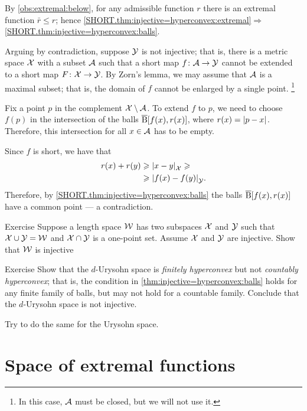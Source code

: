 By \ref{obs:extremal:below}, for any admissible function $r$ there is an extremal function $\bar r\le r$;
hence \ref{SHORT.thm:injective=hyperconvex:extremal}$\Rightarrow$\ref{SHORT.thm:injective=hyperconvex:balls}.

Arguing by contradiction, suppose $\mathcal{Y}$ is not injective;
that is, there is a metric space $\mathcal{X}$ with a subset $\mathcal{A}$
such that a short map $f\colon\mathcal{A}\to \mathcal{Y}$ cannot be extended to a short map $F\colon\mathcal{X}\to \mathcal{Y}$.
By Zorn's lemma, we may assume that $\mathcal{A}$ is a maximal subset; that is, the domain of $f$ cannot be enlarged by a single point.%
\footnote{In this case, $\mathcal{A}$ must be closed, but we will not use it.}

Fix a point $p$ in the complement $\mathcal{X}\setminus \mathcal{A}$.
To extend $f$ to $p$, we need to choose $f(p)$ in the intersection of the balls 
$\overline{\mathrm{B}}{}[f(x),r(x)]$, where $r(x)=\dist{p}{x}{}$.
Therefore, this intersection for all $x\in \mathcal{A}$ has to be empty.

Since $f$ is short, we have that 
\begin{align*}
r(x)+r(y)&\ge \dist{x}{y}{\spc{X}}\ge
\\
&\ge \dist{f(x)}{f(y)}{\spc{Y}}.
\end{align*}
Therefore, by \ref{SHORT.thm:injective=hyperconvex:balls} the balls 
$\overline{\mathrm{B}}{}[f(x),r(x)]$ have a common point --- a contradiction. 
\qeds

\begin{thm}{Exercise}\label{ex:one-point-gluing}
Suppose a length space $\mathcal{W}$ has two subspaces $\mathcal{X}$ and $\mathcal{Y}$ such that $\mathcal{X}\cup\mathcal{Y}=\mathcal{W}$ and $\mathcal{X}\cap\mathcal{Y}$ is a one-point set.
Assume $\mathcal{X}$ and $\mathcal{Y}$ are injective.
Show that  $\mathcal{W}$ is injective
\end{thm}

\begin{thm}{Exercise}\label{ex:urysohn-hyperconvex}
Show that the $d$-Urysohn space is {}\emph{finitely hyperconvex} but not {}\emph{countably hyperconvex};
that is, the condition in \ref{thm:injective=hyperconvex:balls} holds for any finite family of balls, but may not hold for a countable family.
Conclude that the $d$-Urysohn space is not injective.

Try to do the same for the Urysohn space.
\end{thm}

\section{Space of extremal functions}
\label{sec:extremal-functions}

